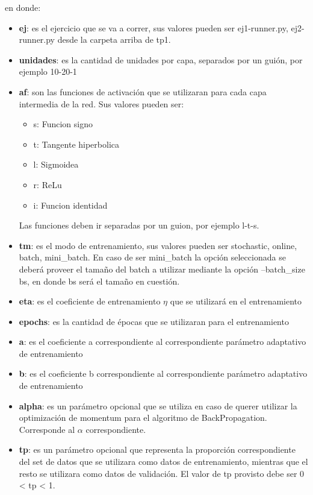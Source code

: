 en donde:
\begin{itemize}
  \item \textbf{ej}: es el ejercicio que se va a correr, sus valores pueden ser {ej1-runner.py, ej2-runner.py} desde la carpeta arriba de tp1.
  \item \textbf{unidades}: es la cantidad de unidades por capa, separados por un guión, por ejemplo 10-20-1
  \item \textbf{af}: son las funciones de activación que se utilizaran para cada capa intermedia de la red. Sus valores pueden ser:
	  \begin{itemize}
	      \item s: Funcion signo
	      \item t: Tangente hiperbolica
          \item l: Sigmoidea
          \item r: ReLu
          \item i: Funcion identidad
       \end{itemize}
	   Las funciones deben ir separadas por un guion, por ejemplo l-t-s.
  \item \textbf{tm}: es el modo de entrenamiento, sus valores pueden ser {stochastic, online, batch, mini\_batch}. En caso de ser mini\_batch la opción seleccionada se deberá
            proveer el tamaño del batch a utilizar mediante la opción --batch\_size bs, en donde bs será el tamaño en cuestión.
  \item \textbf{eta}: es el coeficiente de entrenamiento $\eta$ que se utilizará en el entrenamiento
  \item \textbf{epochs}: es la cantidad de épocas que se utilizaran para el entrenamiento
  \item \textbf{a}: es el coeficiente a correspondiente al correspondiente parámetro adaptativo de entrenamiento
  \item \textbf{b}: es el coeficiente b correspondiente al correspondiente parámetro adaptativo de entrenamiento
  \item \textbf{alpha}: es un parámetro opcional que se utiliza en caso de querer utilizar la optimización de momentum para el algoritmo de BackPropagation. Corresponde al $\alpha$
                correspondiente.
  \item \textbf{tp}: es un parámetro opcional que representa la proporción correspondiente del set de datos que se utilizara como datos de entrenamiento,
            mientras que el resto se utilizara como datos de validación. El valor de tp provisto debe ser 0 < tp < 1.

\end{itemize}
